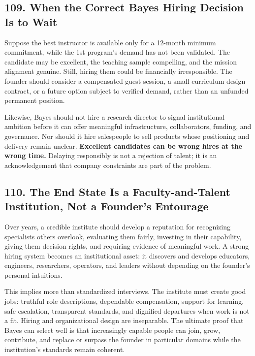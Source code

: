 \subsection*{109. When the Correct Bayes Hiring Decision Is to Wait}

Suppose the best instructor is available only for a 12-month minimum commitment, while the 1st program's demand has not been validated. The candidate may be excellent, the teaching sample compelling, and the mission alignment genuine. Still, hiring them could be financially irresponsible. The founder should consider a compensated guest session, a small curriculum-design contract, or a future option subject to verified demand, rather than an unfunded permanent position.

Likewise, Bayes should not hire a research director to signal institutional ambition before it can offer meaningful infrastructure, collaborators, funding, and governance. Nor should it hire salespeople to sell products whose positioning and delivery remain unclear. \textbf{Excellent candidates can be wrong hires at the wrong time.} Delaying responsibly is not a rejection of talent; it is an acknowledgement that company constraints are part of the problem.

\subsection*{110. The End State Is a Faculty-and-Talent Institution, Not a Founder's Entourage}

Over years, a credible institute should develop a reputation for recognizing specialists others overlook, evaluating them fairly, investing in their capability, giving them decision rights, and requiring evidence of meaningful work. A strong hiring system becomes an institutional asset: it discovers and develops educators, engineers, researchers, operators, and leaders without depending on the founder's personal intuitions.

This implies more than standardized interviews. The institute must create good jobs: truthful role descriptions, dependable compensation, support for learning, safe escalation, transparent standards, and dignified departures when work is not a fit. Hiring and organizational design are inseparable. The ultimate proof that Bayes can select well is that increasingly capable people can join, grow, contribute, and replace or surpass the founder in particular domains while the institution's standards remain coherent.
